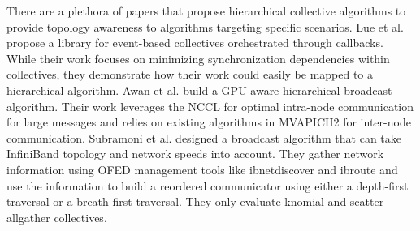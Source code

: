There are a plethora of papers that propose hierarchical collective algorithms to provide topology awareness to algorithms targeting specific scenarios.
Lue et al. \cite{Luo2018ADAPT} propose a library for event-based collectives orchestrated through callbacks.
While their work focuses on minimizing synchronization dependencies within collectives, they demonstrate how their work could easily be mapped to a hierarchical algorithm.
Awan et al. \cite{Awan2016NCCLBcast} build a \gls{GPU}-aware hierarchical broadcast algorithm.
Their work leverages the \gls{NCCL} for optimal intra-node communication for large messages and relies on existing algorithms in MVAPICH2 for inter-node communication.
Subramoni et al. \cite{Subramoni2011SpeedAwareBcast} designed a broadcast algorithm that can take InfiniBand topology and network speeds into account.
They gather network information using \gls{OFED} management tools like ibnetdiscover and ibroute \cite{linuxrdmacore} and use the information to build a reordered communicator using either a depth-first traversal or a breath-first traversal.
They only evaluate knomial and scatter-allgather collectives.

